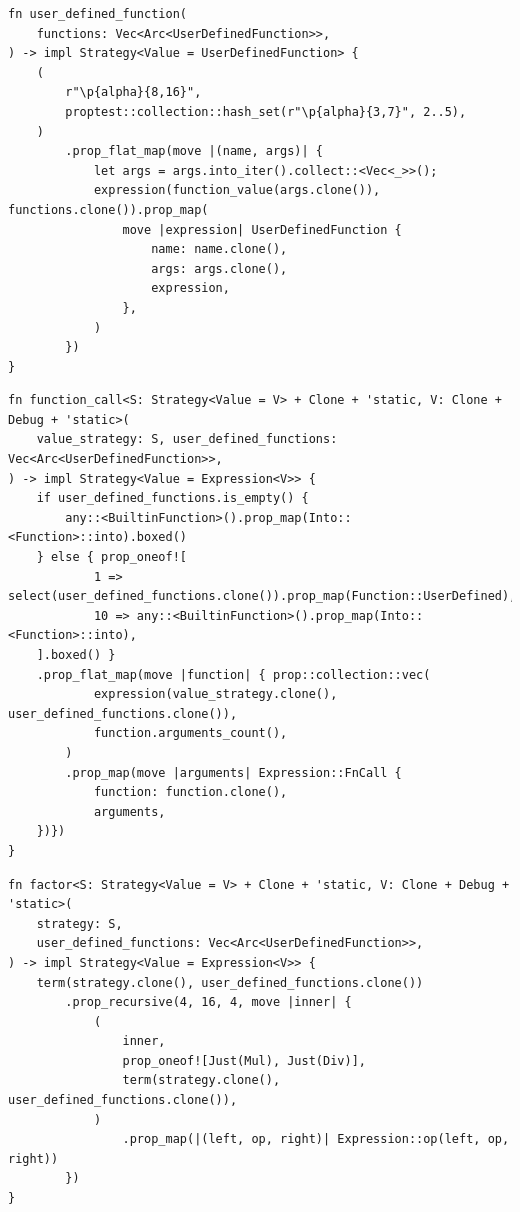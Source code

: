 \begin{frame}[fragile]
    \begin{verbatim}
fn user_defined_function(
    functions: Vec<Arc<UserDefinedFunction>>,
) -> impl Strategy<Value = UserDefinedFunction> {
    (
        r"\p{alpha}{8,16}",
        proptest::collection::hash_set(r"\p{alpha}{3,7}", 2..5),
    )
        .prop_flat_map(move |(name, args)| {
            let args = args.into_iter().collect::<Vec<_>>();
            expression(function_value(args.clone()), functions.clone()).prop_map(
                move |expression| UserDefinedFunction {
                    name: name.clone(),
                    args: args.clone(),
                    expression,
                },
            )
        })
}
    \end{verbatim}
\end{frame}

\begin{frame}[fragile]
    \begin{verbatim}
fn function_call<S: Strategy<Value = V> + Clone + 'static, V: Clone + Debug + 'static>(
    value_strategy: S, user_defined_functions: Vec<Arc<UserDefinedFunction>>,
) -> impl Strategy<Value = Expression<V>> {
    if user_defined_functions.is_empty() {
        any::<BuiltinFunction>().prop_map(Into::<Function>::into).boxed()
    } else { prop_oneof![
            1 => select(user_defined_functions.clone()).prop_map(Function::UserDefined),
            10 => any::<BuiltinFunction>().prop_map(Into::<Function>::into),
    ].boxed() }
    .prop_flat_map(move |function| { prop::collection::vec(
            expression(value_strategy.clone(), user_defined_functions.clone()),
            function.arguments_count(),
        )
        .prop_map(move |arguments| Expression::FnCall {
            function: function.clone(),
            arguments,
    })})
}
    \end{verbatim}
\end{frame}

\begin{frame}[fragile]
    \begin{verbatim}
fn factor<S: Strategy<Value = V> + Clone + 'static, V: Clone + Debug + 'static>(
    strategy: S,
    user_defined_functions: Vec<Arc<UserDefinedFunction>>,
) -> impl Strategy<Value = Expression<V>> {
    term(strategy.clone(), user_defined_functions.clone())
        .prop_recursive(4, 16, 4, move |inner| {
            (
                inner,
                prop_oneof![Just(Mul), Just(Div)],
                term(strategy.clone(), user_defined_functions.clone()),
            )
                .prop_map(|(left, op, right)| Expression::op(left, op, right))
        })
}
    \end{verbatim}
\end{frame}


